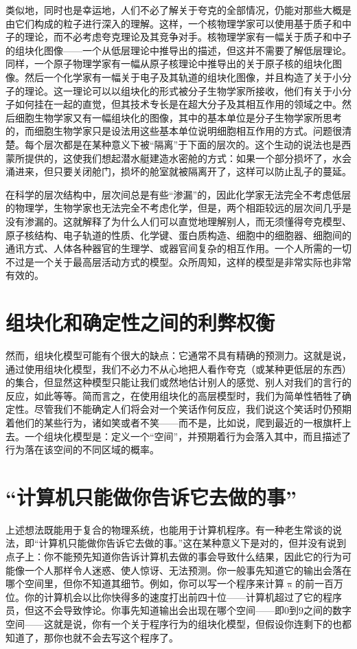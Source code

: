 类似地，同时也是幸运地，人们不必了解关于夸克的全部情况，仍能对那些大概是由它们构成的粒子进行深入的理解。这样，一个核物理学家可以使用基于质子和中子的理论，而不必考虑夸克理论及其竞争对手。核物理学家有一幅关于质子和中子的组块化图像——一个从低层理论中推导出的描述，但这并不需要了解低层理论。同样，一个原子物理学家有一幅从原子核理论中推导出的关于原子核的组块化图像。然后一个化学家有一幅关于电子及其轨道的组块化图像，并且构造了关于小分子的理论。这一理论可以以组块化的形式被分子生物学家所接收，他们有关于小分子如何挂在一起的直觉，但其技术专长是在超大分子及其相互作用的领域之中。然后细胞生物学家又有一幅组块化的图像，其中的基本单位是分子生物学家所思考的，而细胞生物学家只是设法用这些基本单位说明细胞相互作用的方式。问题很清楚。每个层次都是在某种意义下被“隔离”于下面的层次的。这个生动的说法也是西蒙所提供的，这使我们想起潜水艇建造水密舱的方式：如果一个部分损坏了，水会涌进来，但只要关闭舱门，损坏的舱室就被隔离开了，这样可以防止乱子的蔓延。

在科学的层次结构中，层次间总是有些“渗漏”的，因此化学家无法完全不考虑低层的物理学，生物学家也无法完全不考虑化学，但是，两个相距较远的层次间几乎是没有渗漏的。这就解释了为什么人们可以直觉地理解别人，而无须懂得夸克模型、原子核结构、电子轨道的性质、化学键、蛋白质构造、细胞中的细胞器、细胞间的通讯方式、人体各种器官的生理学、或器官间复杂的相互作用。一个人所需的一切不过是一个关于最高层活动方式的模型。众所周知，这样的模型是非常实际也非常有效的。

\section{组块化和确定性之间的利弊权衡}

然而，组块化模型可能有个很大的缺点：它通常不具有精确的预测力。这就是说，通过使用组块化模型，我们不必力不从心地把人看作夸克（或某种更低层的东西）的集合，但显然这种模型只能让我们或然地估计别人的感觉、别人对我们的言行的反应，如此等等。简而言之，在使用组块化的高层模型时，我们为简单性牺牲了确定性。尽管我们不能确定人们将会对一个笑话作何反应，我们说这个笑话时仍预期着他们的某些行为，诸如笑或者不笑——而不是，比如说，爬到最近的一根旗杆上去。一个组块化模型是：定义一个“空间”，并预期着行为会落入其中，而且描述了行为落在该空间的不同区域的概率。

\section{“计算机只能做你告诉它去做的事”}

上述想法既能用于复合的物理系统，也能用于计算机程序。有一种老生常谈的说法，即“计算机只能做你告诉它去做的事。”这在某种意义下是对的，但并没有说到点子上：你不能预先知道你告诉计算机去做的事会导致什么结果，因此它的行为可能像一个人那样令人迷惑、使人惊讶、无法预测。你一般事先知道它的输出会落在哪个空间里，但你不知道其细节。例如，你可以写一个程序来计算$\uppi$的前一百万位。你的计算机会以比你快得多的速度打出前四十位——计算机超过了它的程序员，但这不会导致悖论。你事先知道输出会出现在哪个空间——即$0$到$9$之间的数字空间——这就是说，你有一个关于程序行为的组块化模型，但假设你连剩下的也都知道了，那你也就不会去写这个程序了。

